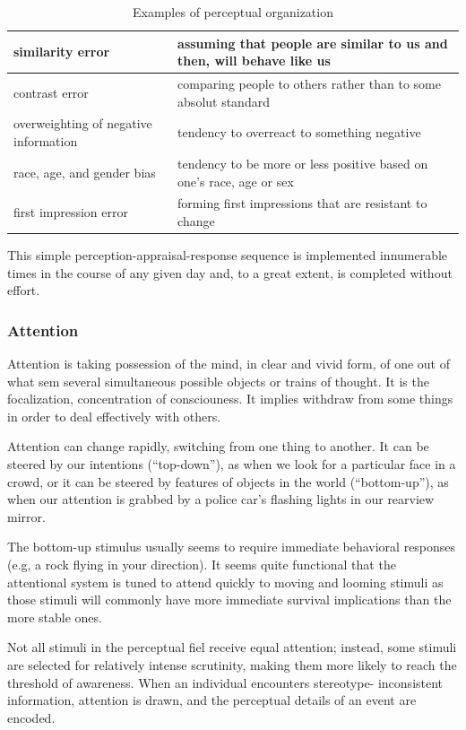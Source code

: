 \documentclass[12pt,article,oneside,a4paper]{memoir}
\begin{document}
\begin{table}
  \begin{tabular}{ p{5cm} |  p{10cm} }
    \hline
    similarity error & assuming that people are similar to us and then, will
    behave like us \\ \hline
    contrast error & comparing people to others rather than to some absolut
    standard \\ \hline
    overweighting of negative information & tendency to overreact to something
    negative \\ \hline
    race, age, and gender bias & tendency to be more or less positive based on
    one's race, age or sex \\ \hline
	first impression error & forming first impressions that are resistant to
	change \\ 
    \hline
  \end{tabular}
  \caption{Examples of perceptual organization}
  \label{table:accuracy-judgment}
\end{table}

This simple perception-appraisal-response sequence is implemented innumerable
times in the course of any given day and, to a great extent, is completed
without effort.

\subsubsection{Attention}
Attention is taking possession of the mind, in clear and vivid form, of one out
of what sem several simultaneous possible objects or trains of thought. It is
the focalization, concentration of consciouness. It implies withdraw from some
things in order to deal effectively with others.

Attention can change rapidly, switching from one thing to another. It can be
steered by our intentions (``top-down''), as when we look for a particular face
in a crowd, or it can be steered by features of objects in the world
(``bottom-up''), as when our attention is grabbed by a police car's flashing
lights in our rearview mirror.

The bottom-up stimulus usually seems to require immediate behavioral responses
(e.g, a rock flying in your direction). It seems quite functional that the
attentional system is tuned to attend quickly to moving and looming stimuli as
those stimuli will commonly have more immediate survival implications than the
more stable ones.

Not all stimuli in the perceptual fiel receive equal attention; instead, some
stimuli are selected for relatively intense scrutinity, making them more likely
to reach the threshold of awareness. When an individual encounters stereotype-
inconsistent information, attention is drawn, and the perceptual details of an
event are encoded.
\end{document}
